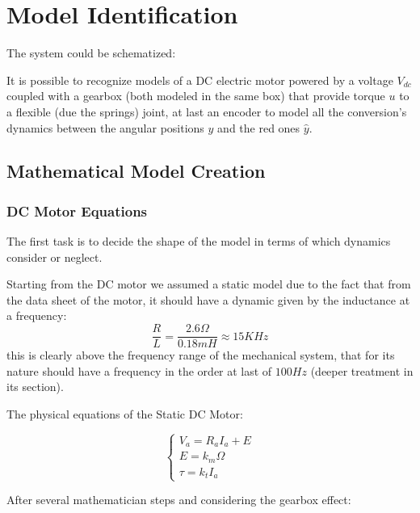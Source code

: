 \chapter{Model Identification}
\label{cha:model_identification}

    The system could be schematized:


    It is possible to recognize models of a DC electric motor powered by a voltage $V_{dc}$ coupled with a gearbox (both modeled in the same box) that provide torque $u$ to a flexible (due the springs) joint, at last an encoder to model all the conversion's dynamics between the angular positions $y$ and the red ones $\hat{y}$.

    \section{Mathematical Model Creation}

        \subsection{DC Motor Equations}

            The first task is to decide the shape of the model in terms of which dynamics consider or neglect.

            Starting from the DC motor we assumed a static model due to the fact that from the data sheet of the motor, it should have a dynamic given by the inductance at a frequency:
            \[
                \frac{R}{L} = \frac{2.6 \Omega}{0.18 mH} \approx  15 KHz\]
            this is clearly above the frequency range of the mechanical system, that for its nature should have a frequency in the order at last of $100 Hz$ (deeper treatment in its section).
            
            The physical equations of the Static DC Motor:
            
            \begin{equation*}
                \begin{cases}
                    V_a = R_a I_a + E \\
                    E = k_m \Omega \\
                    \tau = k_t I_a
                \end{cases}
            \end{equation*}

            After several mathematician steps and considering the gearbox effect:

